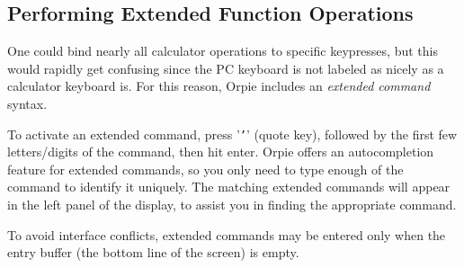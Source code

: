 \documentclass[11pt,notitlepage]{article}
\begin{document}
\subsection{Performing Extended Function Operations}
\label{extendedfunctions}
One could bind nearly all calculator operations to specific keypresses, but this
would rapidly get confusing since the PC keyboard is not labeled as nicely as a
calculator keyboard is.  For this reason, Orpie includes an {\em extended
command} syntax.

To activate an extended command, press '{\tt '}' (quote key), followed by the
first few letters/digits of the command, then hit enter.  Orpie offers an
autocompletion feature for extended commands, so you only need to type enough of
the command to identify it uniquely.  The matching extended commands will appear
in the left panel of the display, to assist you in finding the appropriate
command.

To avoid interface conflicts, extended commands may be entered only when the
entry buffer (the bottom line of the screen) is empty.
\end{document}
